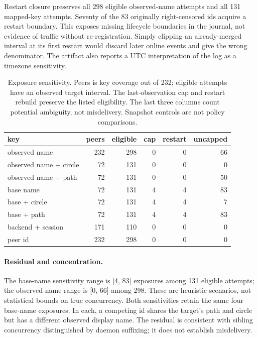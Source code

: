 \documentclass[10pt,twocolumn]{article}
\begin{document}
Restart closure preserves all 298 eligible observed-name attempts and all 131 mapped-key attempts. Seventy of the 83 originally right-censored ids acquire a restart boundary. This exposes missing lifecycle boundaries in the journal, not evidence of traffic without re-registration. Simply clipping an already-merged interval at its first restart would discard later online events and give the wrong denominator. The artifact also reports a UTC interpretation of the log as a timezone sensitivity.

\begin{table}[t]
\caption{Exposure sensitivity. Peers is key coverage out of 232; eligible attempts have an observed target interval. The last-observation cap and restart rebuild preserve the listed eligibility. The last three columns count potential ambiguity, not misdelivery. Snapshot controls are not policy comparisons.}
\label{tab:exposure}
\centering\scriptsize
\setlength{\tabcolsep}{2.7pt}
\begin{tabular}{@{}lrrrrr@{}}
\toprule
key & peers & eligible & cap & restart & uncapped \\
\midrule
observed name & 232 & 298 & 0 & 0 & 66 \\
observed name + circle & 72 & 131 & 0 & 0 & 0 \\
observed name + path & 72 & 131 & 0 & 0 & 50 \\
base name & 72 & 131 & 4 & 4 & 83 \\
base + circle & 72 & 131 & 4 & 4 & 7 \\
base + path & 72 & 131 & 4 & 4 & 83 \\
\midrule
backend + session & 171 & 110 & 0 & 0 & 0 \\
peer id & 232 & 298 & 0 & 0 & 0 \\
\bottomrule
\end{tabular}
\end{table}

\paragraph{Residual and concentration.}
The base-name sensitivity range is [4, 83] exposures among 131 eligible attempts; the observed-name range is [0, 66] among 298. These are heuristic scenarios, not statistical bounds on true concurrency. Both sensitivities retain the same four base-name exposures. In each, a competing id shares the target's path and circle but has a different observed display name. The residual is consistent with sibling concurrency distinguished by daemon suffixing; it does not establish misdelivery.
\end{document}

